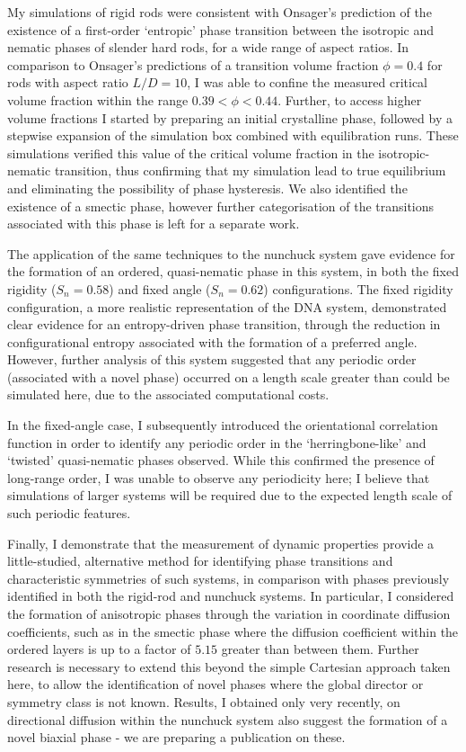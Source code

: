 \documentclass[11pt, a4paper]{article} %
\begin{document}
My simulations of rigid rods were consistent with Onsager's prediction of the existence of a first-order `entropic' phase transition between the isotropic and nematic phases of slender hard rods, for a wide range of aspect ratios. In comparison to Onsager's predictions of a transition volume fraction $\phi = 0.4$ for rods with aspect ratio $L/D = 10$, I was able to confine the measured critical volume fraction within the range $0.39<\phi<0.44$. Further, to access higher volume fractions I started by preparing an initial crystalline phase, followed by a stepwise expansion of the simulation box combined with equilibration runs. These simulations verified this value of the critical volume fraction in the isotropic-nematic transition, thus confirming that my simulation lead to true equilibrium and eliminating the possibility of phase hysteresis. We also identified the existence of a smectic phase, however further categorisation of the transitions associated with this phase is left for a separate work.

The application of the same techniques to the nunchuck system gave evidence for the formation of an ordered, quasi-nematic phase in this system, in both the fixed rigidity ($S_{n} = 0.58$) and fixed angle ($S_{n} = 0.62$) configurations. The fixed rigidity configuration, a more realistic representation of the DNA system, demonstrated clear evidence for an entropy-driven phase transition, through the reduction in configurational entropy associated with the formation of a preferred angle. However, further analysis of this system suggested that any periodic order (associated with a novel phase) occurred on a length scale greater than could be simulated here, due to the associated computational costs.

In the fixed-angle case, I subsequently introduced the orientational correlation function in order to identify any periodic order in the `herringbone-like' and `twisted' quasi-nematic phases observed. While this confirmed the presence of long-range order, I was unable to observe any periodicity here; I believe that simulations of larger systems will be required due to the expected length scale of such periodic features.

Finally, I demonstrate that the measurement of dynamic properties provide a little-studied, alternative method for identifying phase transitions and characteristic symmetries of such systems, in comparison with phases previously identified in both the rigid-rod and nunchuck systems. In particular, I considered the formation of anisotropic phases through the variation in coordinate diffusion coefficients, such as in the smectic phase where the diffusion coefficient within the ordered layers is up to a factor of $5.15$ greater than between them. Further research is necessary to extend this beyond the simple Cartesian approach taken here, to allow the identification of novel phases where the global director or symmetry class is not known. Results, I obtained only very recently, on directional diffusion within the nunchuck system also suggest the formation of a novel biaxial phase - we are preparing a publication on these.
\end{document}
